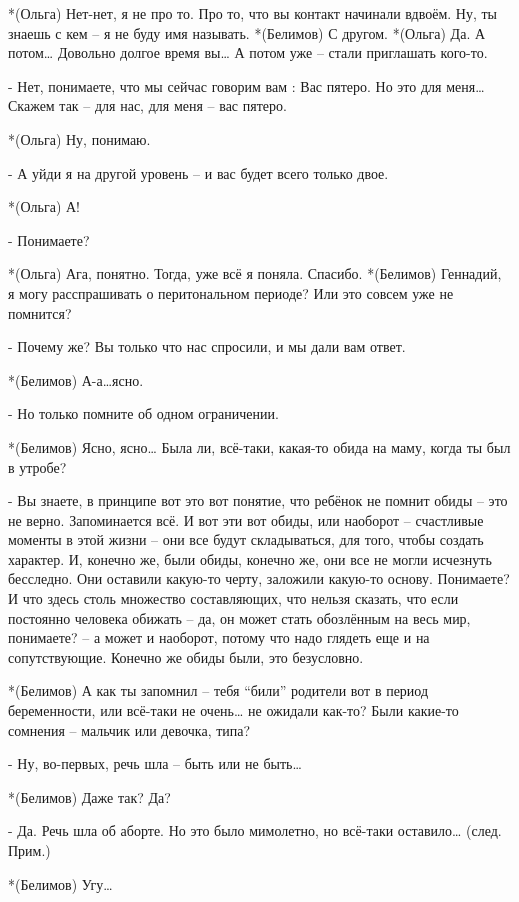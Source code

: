 *(Ольга) Нет-нет, я не про то. Про то, что вы контакт начинали вдвоём. Ну, ты знаешь с кем – я не буду имя называть.
*(Белимов) С другом.
*(Ольга) Да. А потом… Довольно долгое время вы… А потом уже – стали приглашать кого-то.

- Нет, понимаете, что мы сейчас говорим вам : Вас пятеро. Но это для меня… Скажем так – для нас, для меня – вас пятеро. 

*(Ольга) Ну, понимаю.

- А уйди я на другой уровень – и вас будет всего только двое.

*(Ольга) А!

- Понимаете?

*(Ольга) Ага, понятно. Тогда, уже всё  я поняла. Спасибо.
*(Белимов) Геннадий, я могу расспрашивать о перитональном периоде? Или это совсем уже не помнится? 

- Почему же? Вы только что нас спросили, и мы дали вам ответ. 

*(Белимов) А-а…ясно.

- Но только помните об одном ограничении.

*(Белимов) Ясно, ясно… Была ли, всё-таки, какая-то обида на маму, когда ты был в утробе?

- Вы знаете, в принципе вот это вот понятие, что ребёнок не помнит обиды – это не верно. Запоминается всё. И вот эти вот обиды, или наоборот – счастливые моменты в этой жизни – они все будут складываться, для того, чтобы создать характер. И, конечно же, были  обиды, конечно же, они все не могли исчезнуть бесследно. Они оставили какую-то черту, заложили какую-то основу. Понимаете? И что здесь столь множество составляющих, что нельзя сказать, что если постоянно человека обижать – да, он может стать обозлённым на весь мир, понимаете? – а может и наоборот, потому что надо глядеть еще и на сопутствующие. Конечно же обиды были, это безусловно.

*(Белимов) А как ты запомнил – тебя “били” родители вот в период беременности, или всё-таки не очень… не ожидали как-то? Были какие-то сомнения – мальчик или девочка, типа?

- Ну, во-первых, речь шла – быть или не быть…

*(Белимов) Даже так? Да?

- Да. Речь шла об аборте. Но это было мимолетно, но всё-таки оставило… (след. Прим.)

*(Белимов) Угу…

